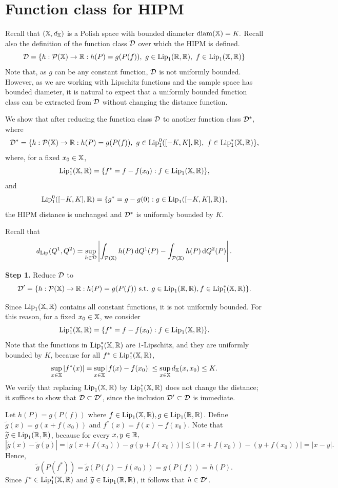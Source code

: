 \section{Function class for HIPM}\label{appendix:reductionD}
Recall that $(\mathbb{X},d_{\mathbb{X}})$ is a Polish space with bounded diameter $\mathrm{diam}(\mathbb{X}) = K.$ Recall also the definition of the function class $\mathcal{D}$ over which the HIPM is defined.
\[
\mathcal{D} = \{h:\mathcal{P}(\mathbb{X})\to \mathbb{R}: h(P) = g(P(f)), \ g\in \mathrm{Lip}_1(\mathbb{R},\mathbb{R}), \ f\in \mathrm{Lip}_1(\mathbb{X},\mathbb{R}) \}
\]
Note that, as $g$ can be any constant function, $\mathcal{D}$ is not uniformly bounded. However, as we are working with Lipschitz functions and the sample space has bounded diameter, it is natural to expect that a uniformly bounded function class can be extracted from $\mathcal{D}$ without changing the distance function. 

We show that after reducing the function class $\mathcal{D}$ to another function class $\mathcal{D}^*,$ where 
\begin{equation}\label{definition:dstar}
\mathcal{D}^* = \{h:\mathcal{P}(\mathbb{X}) \to \mathbb{R} : h(P) = g(P(f)), \ g \in \mathrm{Lip}_1^0([-K,K],\mathbb{R}), \ f \in \mathrm{Lip}_1^*(\mathbb{X},\mathbb{R}) \},
\end{equation}
where, for a fixed $x_0 \in \mathbb{X}$,
\[
\mathrm{Lip}_1^*(\mathbb{X},\mathbb{R}) = \{ f^* = f - f(x_0) : f \in \mathrm{Lip}_1(\mathbb{X},\mathbb{R}) \},
\]
and
\[
\mathrm{Lip}_1^0([-K,K],\mathbb{R}) = \{ g^* = g - g(0) : g \in \mathrm{Lip}_1([-K,K],\mathbb{R}) \},
\]
the HIPM distance is unchanged and $\mathcal{D}^*$ is uniformly bounded by $K.$

Recall that
\[
d_{\mathrm{Lip}}(Q^1,Q^2) = \sup_{h\in \mathcal{D}}\left| \int_{\mathcal{P}(\mathbb{X})} h(P)\,\mathrm{d}Q^1(P) - \int_{\mathcal{P}(\mathbb{X})} h(P)\,\mathrm{d}Q^2(P) \right|.
\]

\textbf{Step 1.} Reduce $\mathcal{D}$ to
\[
\mathcal{D}' =  \{h : \mathcal{P}(\mathbb{X}) \to \mathbb{R} : h(P) = g(P(f)) \text{ s.t. } g \in \mathrm{Lip}_1(\mathbb{R},\mathbb{R}), f \in \mathrm{Lip}_1^*(\mathbb{X},\mathbb{R}) \}.
\]

Since $\mathrm{Lip}_1(\mathbb{X},\mathbb{R})$ contains all constant functions, it is not uniformly bounded. For this reason, for a fixed $x_0 \in \mathbb{X}$, we consider
\[
\mathrm{Lip}_1^*(\mathbb{X},\mathbb{R}) = \{ f^* = f - f(x_0) : f\in \mathrm{Lip}_1(\mathbb{X},\mathbb{R})\}.
\]
Note that the functions in $\mathrm{Lip}_1^*(\mathbb{X},\mathbb{R})$ are $1$-Lipschitz, and they are uniformly bounded by $K$, because for all $f^*\in \mathrm{Lip}_1^*(\mathbb{X},\mathbb{R})$,
\[
\sup_{x\in\mathbb{X}}|f^*(x)| = \sup_{x\in\mathbb{X}}|f(x) - f(x_0) |\leq \sup_{x\in \mathbb{X}}d_{\mathbb{X}}(x,x_0)\leq K.
\]
We verify that replacing $\mathrm{Lip}_1(\mathbb{X},\mathbb{R})$ by $\mathrm{Lip}_1^*(\mathbb{X},\mathbb{R})$ does not change the distance; it suffices to show that $\mathcal{D} \subset \mathcal{D}'$, since the inclusion $\mathcal{D}' \subset \mathcal{D}$ is immediate.

Let $h(P) = g(P(f))$ where $f\in\mathrm{Lip}_1(\mathbb{X},\mathbb{R}), g\in \mathrm{Lip}_1(\mathbb{R},\mathbb{R})$. Define $\widetilde{g}(x) = g(x + f(x_0))$ and $f^*(x) = f(x) - f(x_0)$. Note that $\widetilde{g}\in \mathrm{Lip}_1(\mathbb{R},\mathbb{R})$, because for every $x, y \in \mathbb{R},$
\[
|\widetilde{g}(x) - \widetilde{g}(y)| = |g(x+f(x_0)) - g(y+f(x_0))| \leq |(x+f(x_0)) - (y + f(x_0))| = |x-y|.
\]
Hence,
\[
\widetilde{g}(P(f^*)) = \widetilde{g}(P(f) - f(x_0)) = g(P(f)) = h(P).
\]
Since $f^* \in \mathrm{Lip}_1^*(\mathbb{X},\mathbb{R})$ and $\widetilde{g} \in \mathrm{Lip}_1(\mathbb{R},\mathbb{R})$, it follows that $h \in \mathcal{D}'$.

